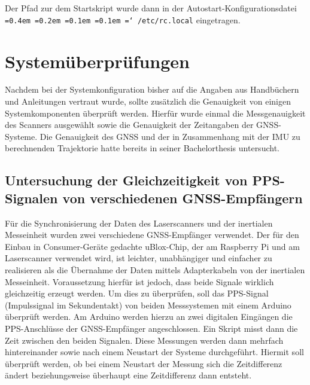 \documentclass[a4paper,12pt,bibliography=totoc, listof=totoc,titlepage,pointlessnumbers]{scrreprt}
\newcommand*\justify{%
  \fontdimen2\font=0.4em%
  \fontdimen3\font=0.2em%
  \fontdimen4\font=0.1em%
  \fontdimen7\font=0.1em%
  \hyphenchar\font=`\-%
}
\newcommand{\code}[1]{\texttt{\justify{#1}}}
\begin{document}
Der Pfad zur dem Startskript wurde dann in der Autostart-Konfigurationsdatei \code{/etc/rc.local} eingetragen.


\chapter{Systemüberprüfungen}
\label{c:systemueberpruefung}
Nachdem bei der Systemkonfiguration bisher auf die Angaben aus Handbüchern und Anleitungen vertraut wurde, sollte zusätzlich die Genauigkeit von einigen Systemkomponenten überprüft werden. Hierfür wurde einmal die Messgenauigkeit des Scanners ausgewählt sowie die Genauigkeit der Zeitangaben der GNSS-Systeme. Die Genauigkeit des GNSS und der in Zusammenhang mit der IMU zu berechnenden Trajektorie hatte bereits \citet{wilken} in seiner Bachelorthesis untersucht.

\section{Untersuchung der Gleichzeitigkeit von PPS-Signalen von verschiedenen GNSS-Empfängern}
Für die Synchronisierung der Daten des Laser\-scan\-ners und der inertialen Messeinheit wurden zwei verschiedene GNSS-Empfänger verwendet. Der für den Einbau in Consumer-Geräte gedachte uBlox-Chip, der am Raspberry Pi und am Laser\-scan\-ner verwendet wird, ist leichter, unabhängiger und einfacher zu realisieren als die Übernahme der Daten mittels Adapterkabeln von der inertialen Messeinheit. Voraussetzung hierfür ist jedoch, dass beide Signale wirklich gleichzeitig erzeugt werden. Um dies zu überprüfen, soll das PPS-Signal (Impulssignal im Sekundentakt) von beiden Messsystemen mit einem Arduino überprüft werden.
Am Arduino werden hierzu an zwei digitalen Eingängen die PPS-Anschlüsse der GNSS-Empfänger angeschlossen. Ein Skript  misst dann die Zeit zwischen den beiden Signalen. Diese Messungen werden dann mehrfach hintereinander sowie nach einem Neustart der Systeme durchgeführt. Hiermit soll überprüft werden, ob bei einem Neustart der Messung sich die Zeitdifferenz ändert beziehungsweise überhaupt eine Zeitdifferenz dann entsteht.
\end{document}
